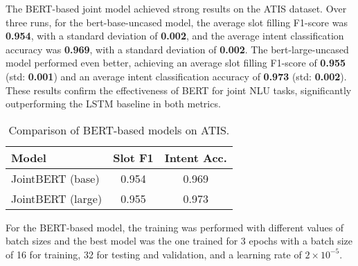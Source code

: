 \documentclass[a4paper]{article}
\begin{document}
The BERT-based joint model achieved strong results on the ATIS dataset. Over three runs, for the bert-base-uncased model, the average slot filling F1-score was \textbf{ 0.954}, with a standard deviation of \textbf{0.002}, and the average intent classification accuracy
 was \textbf{0.969}, with a standard deviation of \textbf{0.002}. The bert-large-uncased model performed even better, achieving an average slot filling F1-score of \textbf{0.955} (std: \textbf{0.001}) and an average intent classification accuracy of \textbf{0.973} (std: \textbf{0.002}). 
These results confirm the effectiveness of BERT for joint NLU tasks, significantly outperforming the LSTM baseline in both metrics.

\begin{table}[h!]
  \centering
  \begin{tabular}{lcc}
    \toprule
    \textbf{Model} & \textbf{Slot F1} & \textbf{Intent Acc.} \\
    \midrule
    JointBERT (base) & 0.954 & 0.969 \\
    JointBERT (large)   & 0.955 & 0.973 \\
    \bottomrule
  \end{tabular}
  \caption{Comparison of BERT-based models on ATIS.}
  \label{tab:results}
\end{table}

For the BERT-based model, the training was performed with different values of 
batch sizes and the best model was the one trained for 3 epochs with
 a batch size of 16 for 
training, 32 for testing and validation, and a learning rate 
of $2 \times 10^{-5}$.




\end{document}
